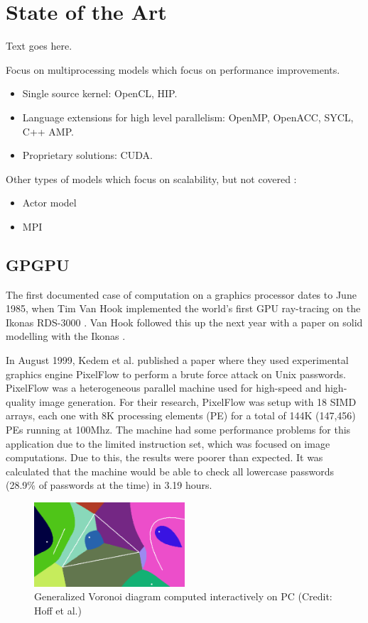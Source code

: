 \chapter{State of the Art}

Text goes here.

Focus on multiprocessing models which focus on performance improvements.

\begin{itemize}
    \item Single source kernel: OpenCL, HIP.
    \item Language extensions for high level parallelism: OpenMP, OpenACC, SYCL, C++ AMP.
    \item Proprietary solutions: CUDA.
\end{itemize}

Other types of models which focus on scalability, but not covered \cite{survey_programming_models}:

\begin{itemize}
    \item Actor model
    \item MPI
\end{itemize}

\section{GPGPU}
The first documented case of computation on a graphics processor dates to June 1985, when Tim Van Hook implemented the world's first GPU ray-tracing on the Ikonas RDS-3000 \cite{ikonas}. Van Hook followed this up the next year with a paper on solid modelling with the Ikonas \cite{solid_modeling_ikonas}.

In August 1999, Kedem et al. \cite{unix_passwords_gpgpu} published a paper where they used experimental graphics engine PixelFlow to perform a brute force attack on Unix passwords. PixelFlow was a heterogeneous parallel machine used for high-speed and high-quality image generation. For their research, PixelFlow was setup with 18 SIMD arrays, each one with 8K processing elements (PE) for a total of 144K (147,456) PEs running at 100Mhz. The machine had some performance problems for this application due to the limited instruction set, which was focused on image computations. Due to this, the results were poorer than expected. It was calculated that the machine would be able to check all lowercase passwords (28.9\% of passwords at the time) in 3.19 hours.

\begin{figure}[h]
    \centering
    \includegraphics[width=0.5\textwidth]{img/voronoi.png}
    \captionsetup{justification=centering}
    \caption{Generalized Voronoi diagram computed interactively on PC (Credit: Hoff et al.)}
\end{figure}

